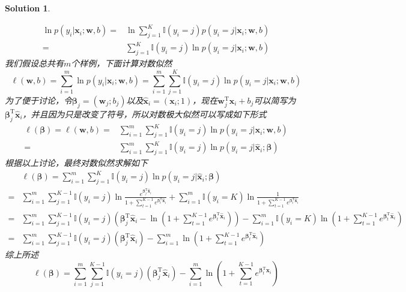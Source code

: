 \documentclass[a4paper,UTF8]{article}
\numberwithin{equation}{section}
\newtheorem*{solution}{Solution}
\begin{document}
\begin{solution}
\begin{enumerate}
\begin{equation}
\begin{aligned}
\ln p(y_i|\mathbf{x}_i;\mathbf{w}, b) =& \ln \sum_{j=1}^{K}\mathbb{I}(y_i=j) p(y_i=j|\mathbf{x}_i;\mathbf{w}, b)\\
=& \sum_{j=1}^{K}\mathbb{I}(y_i=j)\ln p(y_i=j|\mathbf{x}_i;\mathbf{w}, b)
\end{aligned}
\end{equation}
我们假设总共有$m$个样例，下面计算对数似然
\begin{equation}
\ell(\mathbf{w}, b) = \sum_{i=1}^{m}\ln p(y_i|\mathbf{x}_i;\mathbf{w}, b)
= \sum_{i=1}^{m}\sum_{j=1}^{K}\mathbb{I}(y_i=j)\ln p(y_i=j|\mathbf{x}_i;\mathbf{w}, b)
\end{equation}
为了便于讨论，令$\boldsymbol{\beta}_j = (\mathbf{w}_j; b_j)$以及$\hat{\mathbf{x}}_i = (\mathbf{x}_i; 1)$，现在$\mathbf{w}_j^\mathrm{T}\mathbf{x}_i+b_j$可以简写为$\boldsymbol{\beta}_j^\mathrm{T}\hat{\mathbf{x}}_i$，并且因为只是改变了符号，所以对数极大似然可以写成如下形式
\begin{equation}
\begin{aligned}
\ell(\boldsymbol{\beta}) = \ell(\mathbf{w}, b) 
=& \sum_{i=1}^{m}\sum_{j=1}^{K}\mathbb{I}(y_i=j)\ln p(y_i=j|\mathbf{x}_i;\mathbf{w}, b)\\
=&\sum_{i=1}^{m}\sum_{j=1}^{K}\mathbb{I}(y_i=j)\ln p(y_i=j|\hat{\mathbf{x}}_i;\boldsymbol{\beta})
\end{aligned}
\end{equation}
根据以上讨论，最终对数似然求解如下
\begin{equation}
\begin{aligned}
&\ell(\boldsymbol{\beta}) = \sum_{i=1}^{m}\sum_{j=1}^{K}\mathbb{I}(y_i=j)\ln p(y_i=j|\hat{\mathbf{x}}_i;\boldsymbol{\beta})\\
=& \sum_{i=1}^{m}\sum_{j=1}^{K-1}\mathbb{I}(y_i=j)\ln \frac{e^{\boldsymbol{\beta}_j^\mathrm{T}\hat{\mathbf{x}}_i}}{1 + \sum_{t=1}^{K-1}e^{\boldsymbol{\beta}_t^\mathrm{T}\hat{\mathbf{x}}_i}} + \sum_{i=1}^{m}\mathbb{I}(y_i=K)\ln\frac{1}{1 + \sum_{t=1}^{K-1}e^{\boldsymbol{\beta}_t^\mathrm{T}\hat{\mathbf{x}}_i}}\\
=& \sum_{i=1}^{m}\sum_{j=1}^{K-1}\mathbb{I}(y_i=j)(\boldsymbol{\beta}_j^\mathrm{T}\hat{\mathbf{x}}_i- \ln (1 + \sum_{t=1}^{K-1}e^{\boldsymbol{\beta}_t^\mathrm{T}\hat{\mathbf{x}}_i})) - \sum_{i=1}^{m}\mathbb{I}(y_i=K)\ln(1 + \sum_{t=1}^{K-1}e^{\boldsymbol{\beta}_t^\mathrm{T}\hat{\mathbf{x}}_i})\\
=&\sum_{i=1}^{m}\sum_{j=1}^{K-1}\mathbb{I}(y_i=j)(\boldsymbol{\beta}_j^\mathrm{T}\hat{\mathbf{x}}_i) - \sum_{i=1}^{m}\ln(1 + \sum_{t=1}^{K-1}e^{\boldsymbol{\beta}_t^\mathrm{T}\hat{\mathbf{x}}_i})
\end{aligned}
\end{equation}
综上所述
\begin{equation}
\ell(\boldsymbol{\beta}) = \sum_{i=1}^{m}\sum_{j=1}^{K-1}\mathbb{I}(y_i=j)(\boldsymbol{\beta}_j^\mathrm{T}\hat{\mathbf{x}}_i) - \sum_{i=1}^{m}\ln(1 + \sum_{t=1}^{K-1}e^{\boldsymbol{\beta}_t^\mathrm{T}\hat{\mathbf{x}}_i})
\end{equation}


\end{enumerate}
\end{solution}
\end{document}
